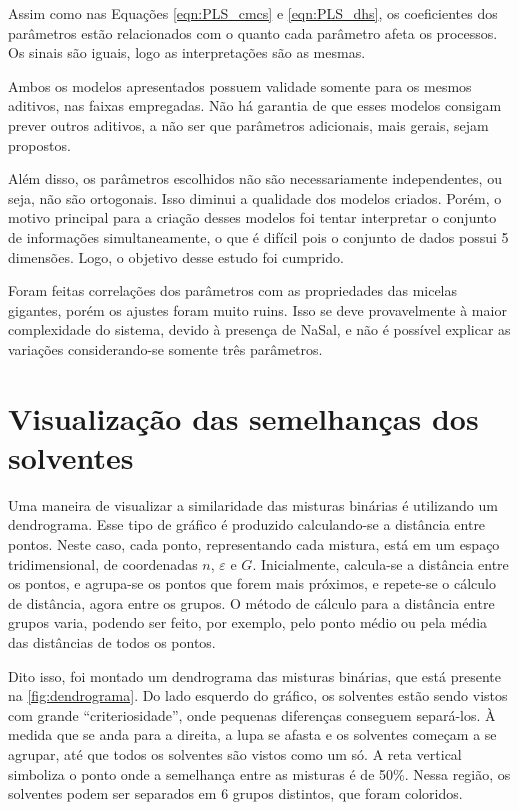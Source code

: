 		Assim como nas Equações \ref{eqn:PLS_cmcs} e \ref{eqn:PLS_dhs}, os coeficientes dos parâmetros estão relacionados com o quanto cada parâmetro afeta os processos. Os sinais são iguais, logo as interpretações são as mesmas.
		
		Ambos os modelos apresentados possuem validade somente para os mesmos aditivos, nas faixas empregadas. Não há garantia de que esses modelos consigam prever outros aditivos, a não ser que parâmetros adicionais, mais gerais, sejam propostos.
		
		Além disso, os parâmetros escolhidos não são necessariamente independentes, ou seja, não são ortogonais. Isso diminui a qualidade dos modelos criados. Porém, o motivo principal para a criação desses modelos foi tentar interpretar o conjunto de informações simultaneamente, o que é difícil pois o conjunto de dados possui 5 dimensões. Logo, o objetivo desse estudo foi cumprido.
		
		Foram feitas correlações dos parâmetros com as propriedades das micelas gigantes, porém os ajustes foram muito ruins. Isso se deve provavelmente à maior complexidade do sistema, devido à presença de NaSal, e não é possível explicar as variações considerando-se somente três parâmetros.
		
		
		\FloatBarrier
		
		\section{Visualização das semelhanças dos solventes}
		
		Uma maneira de visualizar a similaridade das misturas binárias é utilizando um dendrograma. Esse tipo de gráfico é produzido calculando-se a distância entre pontos. Neste caso, cada ponto, representando cada mistura, está em um espaço tridimensional, de coordenadas \(n\), \(\varepsilon\) e \(G\). Inicialmente, calcula-se a distância entre os pontos, e agrupa-se os pontos que forem mais próximos, e repete-se o cálculo de distância, agora entre os grupos. O método de cálculo para a distância entre grupos varia, podendo ser feito, por exemplo, pelo ponto médio ou pela média das distâncias de todos os pontos. %
		
		Dito isso, foi montado um dendrograma das misturas binárias, que está presente na \autoref{fig:dendrograma}. Do lado esquerdo do gráfico, os solventes estão sendo vistos com grande ``criteriosidade'', onde pequenas diferenças conseguem separá-los. À medida que se anda para a direita, a lupa se afasta e os solventes começam a se agrupar, até que todos os solventes são vistos como um só. A reta vertical simboliza o ponto onde a semelhança entre as misturas é de 50\%. Nessa região, os solventes podem ser separados em 6 grupos distintos, que foram coloridos.
		
